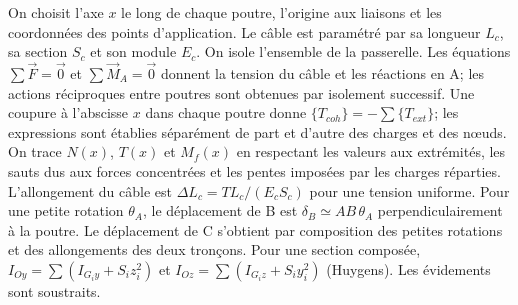 \begin{corrigebox}
On choisit l'axe $x$ le long de chaque poutre, l'origine aux liaisons et
            les coordonnées des points d'application. Le câble est paramétré par sa
            longueur $L_c$, sa section $S_c$ et son module $E_c$.
On isole l'ensemble de la passerelle. Les équations
            $\sum\vec F=\vec0$ et $\sum\vec M_A=\vec0$ donnent la tension du câble et les
            réactions en A; les actions réciproques entre poutres sont obtenues par
            isolement successif.
Une coupure à l'abscisse $x$ dans chaque poutre donne
            $\{T_{coh}\}=-\sum\{T_{ext}\}$; les expressions sont établies séparément de
            part et d'autre des charges et des nœuds.
On trace $N(x)$, $T(x)$ et $M_f(x)$ en respectant les valeurs aux
            extrémités, les sauts dus aux forces concentrées et les pentes imposées par les
            charges réparties.
L'allongement du câble est
            $\boxed{\Delta L_c=TL_c/(E_cS_c)}$ pour une tension uniforme.
Pour une petite rotation $\theta_A$, le déplacement de B est
            $\delta_B\simeq AB\,\theta_A$ perpendiculairement à la poutre. Le déplacement
            de C s'obtient par composition des petites rotations et des allongements des
            deux tronçons.
Pour une section composée,
            $I_{Oy}=\sum(I_{G_i y}+S_i z_i^2)$ et
            $I_{Oz}=\sum(I_{G_i z}+S_i y_i^2)$ (Huygens). Les évidements sont soustraits.
\end{corrigebox}
